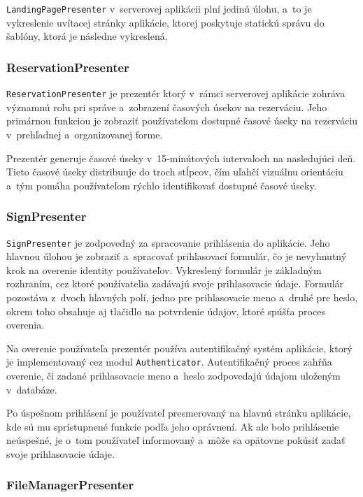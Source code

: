 \verb|LandingPagePresenter| v~serverovej aplikácii plní jedinú úlohu, a~to je vykreslenie uvítacej stránky aplikácie, ktorej poskytuje statickú správu do šablóny, ktorá je následne vykreslená.

\subsubsection*{ReservationPresenter}

\verb|ReservationPresenter| je prezentér ktorý v~rámci serverovej aplikácie zohráva významnú rolu pri správe a~zobrazení časových úsekov na rezerváciu. Jeho primárnou funkciou je zobraziť používateľom dostupné časové úseky na rezerváciu v~prehľadnej a~organizovanej forme. 

Prezentér generuje časové úseky v~15-minútových intervaloch na nasledujúci deň. Tieto časové úseky distribuuje do troch stĺpcov, čím uľahčí vizuálnu orientáciu a~tým pomáha používateľom rýchlo identifikovať dostupné časové úseky.

\subsubsection*{SignPresenter}

\verb|SignPresenter| je zodpovedný za spracovanie prihlásenia do aplikácie. Jeho hlavnou úlohou je zobraziť a~spracovať prihlasovací formulár, čo je nevyhnutný krok na overenie identity používateľov. Vykreslený formulár je základným rozhraním, cez ktoré používatelia zadávajú svoje prihlasovacie údaje. Formulár pozostáva z~dvoch hlavných polí, jedno pre prihlasovacie meno a~druhé pre heslo, okrem toho obsahuje aj tlačidlo na potvrdenie údajov, ktoré spúšťa proces overenia.

Na overenie používateľa prezentér používa autentifikačný systém aplikácie, ktorý je implementovaný cez modul \verb|Authenticator|. Autentifikačný proces zahŕňa overenie, či zadané prihlasovacie meno a~heslo zodpovedajú údajom uloženým v~databáze.

Po úspešnom prihlásení je používateľ presmerovaný na hlavnú stránku aplikácie, kde sú mu sprístupnené funkcie podľa jeho oprávnení. Ak ale bolo prihlásenie neúspešné, je o~tom používateľ informovaný a~môže sa opätovne pokúsiť zadať svoje prihlasovacie údaje.

\subsubsection*{FileManagerPresenter}

